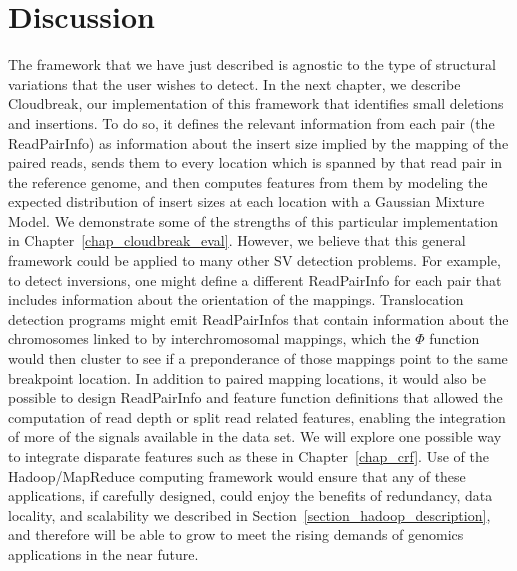 \section{Discussion}\label{section_framework_discussion}

The framework that we have just described is agnostic to the type of structural variations that the user wishes to detect. In the next chapter, we describe Cloudbreak, our implementation of this framework that identifies small deletions and insertions. To do so, it defines the relevant information from each pair (the ReadPairInfo) as information about the insert size implied by the mapping of the paired reads, sends them to every location which is spanned by that read pair in the reference genome, and then computes features from them by modeling the expected distribution of insert sizes at each location with a Gaussian Mixture Model. We demonstrate some of the strengths of this particular implementation in Chapter~\ref{chap_cloudbreak_eval}. However, we believe that this general framework could be applied to many other SV detection problems. For example, to detect inversions, one might define a different ReadPairInfo for each pair that includes information about the orientation of the mappings. Translocation detection programs might emit ReadPairInfos that contain information about the chromosomes linked to by interchromosomal mappings, which the $\Phi$ function would then cluster to see if a preponderance of those mappings point to the same breakpoint location. In addition to paired mapping locations, it would also be possible to design ReadPairInfo and feature function definitions that allowed the computation of read depth or split read related features, enabling the integration of more of the signals available in the data set. We will explore one possible way to integrate disparate features such as these in Chapter~\ref{chap_crf}. Use of the Hadoop/MapReduce computing framework would ensure that any of these applications, if carefully designed, could enjoy the benefits of redundancy, data locality, and scalability we described in Section~\ref{section_hadoop_description}, and therefore will be able to grow to meet the rising demands of genomics applications in the near future.